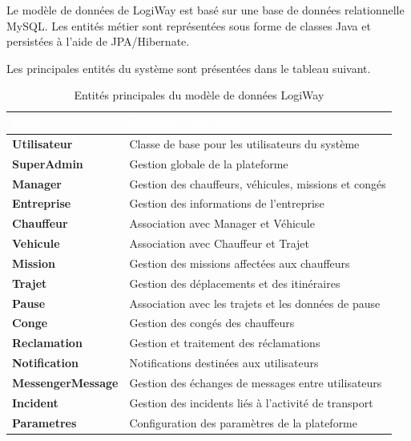 \documentclass[12pt,a4paper]{report}
\newcommand{\thead}[1]{\cellcolor{tablehead}\textcolor{white}{\textbf{#1}}}
\begin{document}
Le modèle de données de LogiWay est basé sur une base de données relationnelle
MySQL. Les entités métier sont représentées sous forme de classes Java et
persistées à l'aide de JPA/Hibernate.

Les principales entités du système sont présentées dans le tableau
suivant.

\begin{table}[H]
  \centering
  \caption{Entités principales du modèle de données LogiWay}
  \label{tab:entites}
  \begin{tabularx}{\textwidth}{|l|Y|}
    \hline
    \thead{Entité} & \thead{Relations principales} \\
    \hline
    \textbf{Utilisateur} &
    Classe de base pour les utilisateurs du système \\
    \hline
    \textbf{SuperAdmin} &
    Gestion globale de la plateforme \\
    \hline
    \textbf{Manager} &
    Gestion des chauffeurs, véhicules, missions et congés \\
    \hline
    \textbf{Entreprise} &
    Gestion des informations de l'entreprise \\
    \hline
    \textbf{Chauffeur} &
    Association avec Manager et Véhicule \\
    \hline
    \textbf{Vehicule} &
    Association avec Chauffeur et Trajet \\
    \hline
    \textbf{Mission} &
    Gestion des missions affectées aux chauffeurs \\
    \hline
    \textbf{Trajet} &
    Gestion des déplacements et des itinéraires \\
    \hline
    \textbf{Pause} &
    Association avec les trajets et les données de pause \\
    \hline
    \textbf{Conge} &
    Gestion des congés des chauffeurs \\
    \hline
    \textbf{Reclamation} &
    Gestion et traitement des réclamations \\
    \hline
    \textbf{Notification} &
    Notifications destinées aux utilisateurs \\
    \hline
    \textbf{MessengerMessage} &
    Gestion des échanges de messages entre utilisateurs \\
    \hline
    \textbf{Incident} &
    Gestion des incidents liés à l'activité de transport \\
    \hline
    \textbf{Parametres} &
    Configuration des paramètres de la plateforme \\
    \hline
  \end{tabularx}
\end{table}
\end{document}
